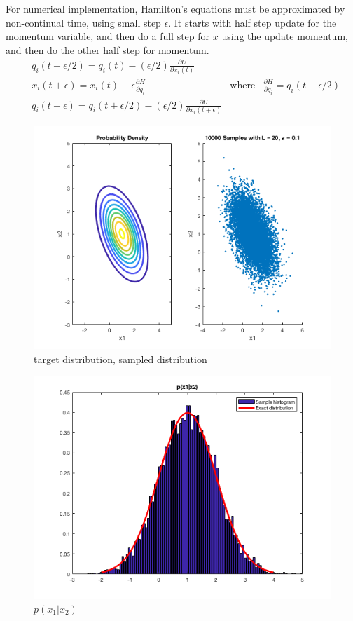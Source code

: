 \documentclass{article}
\begin{document}
For numerical implementation, Hamilton's equations must be approximated by non-continual time, using small step $\epsilon$. 
It starts with half step update for the momentum variable, and then do a full step for $x$ using the update momentum, and then do the other half step for momentum.
\begin{equation}
\begin{aligned}
& q_{i}(t+\epsilon/2) = q_i(t) -(\epsilon/2)\frac{\partial U}{\partial x_{i}(t)} \\
& x_{i}(t+\epsilon) = x_{i}(t)+ \epsilon   \frac{\partial H}{\partial q_i}  & \mbox{where}  &  \frac{\partial H}{\partial q_i}=q_i(t+\epsilon/2) \\ %
& q_{i}(t+\epsilon) = q_i(t+\epsilon/2) -(\epsilon/2)\frac{\partial U}{\partial x_{i}(t+\epsilon)} 
\end{aligned}
\end{equation}


\begin{figure}[h!]
\centering
\includegraphics[scale=0.6]{HW5P3_1.png}
\caption{target distribution, sampled distribution}
\end{figure}

\begin{figure}[h!]
\centering
\includegraphics[scale=0.50]{HW5P3_2.png}
\caption{$p(x_1 | x_2)$}
\end{figure}
\end{document}
